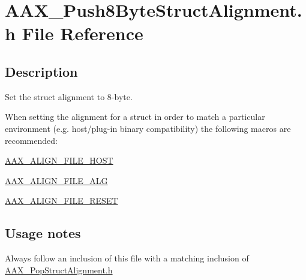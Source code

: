 \hypertarget{a00671}{}\section{A\+A\+X\+\_\+\+Push8\+Byte\+Struct\+Alignment.\+h File Reference}
\label{a00671}


\subsection{Description}
Set the struct alignment to 8-\/byte. 

When setting the alignment for a struct in order to match a particular environment (e.\+g. host/plug-\/in binary compatibility) the following macros are recommended\+: \begin{DoxyItemize}
\item \mbox{\hyperlink{a00392_acbef7ed7d077bc9812cb56417e1ad325}{A\+A\+X\+\_\+\+A\+L\+I\+G\+N\+\_\+\+F\+I\+L\+E\+\_\+\+H\+O\+ST}} \item \mbox{\hyperlink{a00392_a8fbeac3c5db5ac694e85a021ed74dc9e}{A\+A\+X\+\_\+\+A\+L\+I\+G\+N\+\_\+\+F\+I\+L\+E\+\_\+\+A\+LG}} \item \mbox{\hyperlink{a00392_a8aaaefcc3d87025e84d5ccb99b650a87}{A\+A\+X\+\_\+\+A\+L\+I\+G\+N\+\_\+\+F\+I\+L\+E\+\_\+\+R\+E\+S\+ET}}\end{DoxyItemize}
\hypertarget{a00671_AAX_Push8ByteStructAlignment_usagenotes}{}\subsection{Usage notes}\label{a00671_AAX_Push8ByteStructAlignment_usagenotes}
\begin{DoxyItemize}
\item Always follow an inclusion of this file with a matching inclusion of \mbox{\hyperlink{a00653}{A\+A\+X\+\_\+\+Pop\+Struct\+Alignment.\+h}}\end{DoxyItemize}
